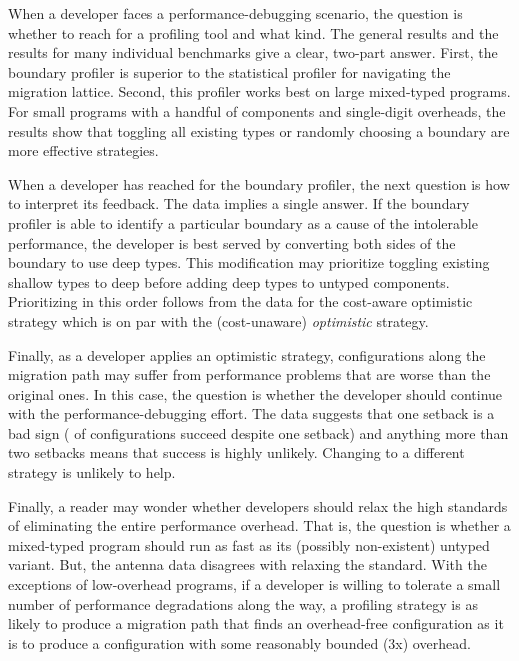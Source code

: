 When a developer faces a performance-debugging scenario, the question is
whether to reach for a profiling tool and what kind. The general results and the
results for many individual benchmarks give a clear, two-part answer.
First, the boundary profiler is superior to the statistical profiler for
navigating the migration lattice.
Second, this profiler works best on large mixed-typed programs.
For small programs with a handful of components and single-digit overheads,
the results show that toggling all existing types or randomly choosing a
boundary are more effective strategies.

When a developer has reached for the boundary profiler, the next question is how
to interpret its feedback. The data implies a single
answer.  If the boundary profiler is able to identify a particular boundary as a
cause of the intolerable performance, the developer is best served by
converting both sides of the boundary to use deep types. This modification
may prioritize toggling existing shallow types to deep before adding deep
types to untyped components. Prioritizing in this order follows from the data
for the cost-aware optimistic strategy which is on par with the (cost-unaware)
\emph{optimistic} strategy.

Finally, as a developer applies an optimistic strategy, configurations
along the migration path may suffer from performance problems that are
worse than the original ones. In this case, the question is whether the
developer should continue with the performance-debugging effort. The data
suggests that one setback is a bad sign ( of configurations
succeed despite one setback) and anything more than two setbacks means
that success is highly unlikely.  Changing to a different strategy is
unlikely to help.

Finally, a reader may wonder whether developers should relax the high
standards of eliminating the entire performance overhead.  That is, the
question is whether a mixed-typed program should run as fast as its
(possibly non-existent) untyped variant. But, the antenna data disagrees
with relaxing the standard. With the exceptions of low-overhead programs,
if a developer is willing to tolerate a small number of performance
degradations along the way, a profiling strategy is as likely to produce
a migration path that finds an overhead-free configuration as it is to
produce a configuration with some reasonably bounded ($3$x) overhead.

